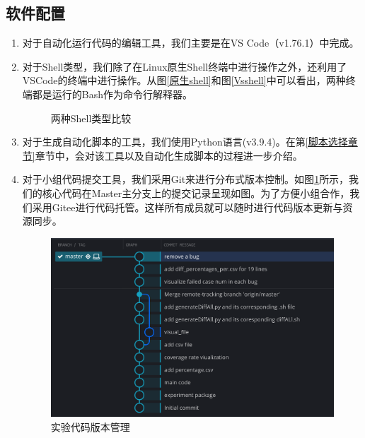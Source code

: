 \documentclass[12pt, a4paper, oneside,bibend=bibtex]{ctexart}
\begin{document}
\subsection{软件配置} 
\begin{enumerate}
    \item 对于自动化运行代码的编辑工具，我们主要是在VS Code（v1.76.1）中完成。
    \item 对于Shell类型，我们除了在Linux原生Shell终端中进行操作之外，还利用了VSCode的终端中进行操作。从图\ref{原生shell}和图\ref{Vsshell}中可以看出，两种终端都是运行的Bash作为命令行解释器。

\begin{figure}[htbp]
	\centering  %
	\caption{两种Shell类型比较}
 \end{figure}
    \item 对于生成自动化脚本的工具，我们使用Python语言(v3.9.4)。在第\ref{脚本选择章节}章节中，会对该工具以及自动化生成脚本的过程进一步介绍。
    \item 对于小组代码提交工具，我们采用Git来进行分布式版本控制。如图\ref{git}所示，我们的核心代码在Master主分支上的提交记录呈现如图。为了方便小组合作，我们采用Gitee进行代码托管。这样所有成员就可以随时进行代码版本更新与资源同步。
    \begin{figure}[htbp]
    \centering
    \includegraphics[width=0.8\linewidth]{images/git.png}
    \caption{实验代码版本管理}
    \label{git}
\end{figure}


\end{enumerate}
\end{document}
